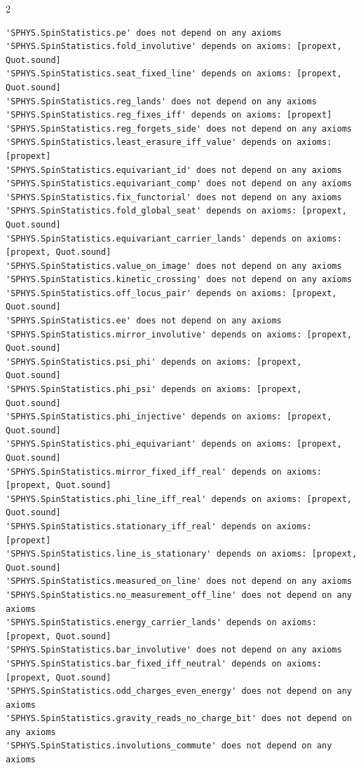 \documentclass[10pt]{article}
\begin{document}
\begin{multicols}{2}
\begin{Verbatim}[fontsize=\fontsize{6.0}{6.9}\selectfont,breaklines,breakanywhere,breaksymbolleft={}]
'SPHYS.SpinStatistics.pe' does not depend on any axioms
'SPHYS.SpinStatistics.fold_involutive' depends on axioms: [propext, Quot.sound]
'SPHYS.SpinStatistics.seat_fixed_line' depends on axioms: [propext, Quot.sound]
'SPHYS.SpinStatistics.reg_lands' does not depend on any axioms
'SPHYS.SpinStatistics.reg_fixes_iff' depends on axioms: [propext]
'SPHYS.SpinStatistics.reg_forgets_side' does not depend on any axioms
'SPHYS.SpinStatistics.least_erasure_iff_value' depends on axioms: [propext]
'SPHYS.SpinStatistics.equivariant_id' does not depend on any axioms
'SPHYS.SpinStatistics.equivariant_comp' does not depend on any axioms
'SPHYS.SpinStatistics.fix_functorial' does not depend on any axioms
'SPHYS.SpinStatistics.fold_global_seat' depends on axioms: [propext, Quot.sound]
'SPHYS.SpinStatistics.equivariant_carrier_lands' depends on axioms: [propext, Quot.sound]
'SPHYS.SpinStatistics.value_on_image' does not depend on any axioms
'SPHYS.SpinStatistics.kinetic_crossing' does not depend on any axioms
'SPHYS.SpinStatistics.off_locus_pair' depends on axioms: [propext, Quot.sound]
'SPHYS.SpinStatistics.ee' does not depend on any axioms
'SPHYS.SpinStatistics.mirror_involutive' depends on axioms: [propext, Quot.sound]
'SPHYS.SpinStatistics.psi_phi' depends on axioms: [propext, Quot.sound]
'SPHYS.SpinStatistics.phi_psi' depends on axioms: [propext, Quot.sound]
'SPHYS.SpinStatistics.phi_injective' depends on axioms: [propext, Quot.sound]
'SPHYS.SpinStatistics.phi_equivariant' depends on axioms: [propext, Quot.sound]
'SPHYS.SpinStatistics.mirror_fixed_iff_real' depends on axioms: [propext, Quot.sound]
'SPHYS.SpinStatistics.phi_line_iff_real' depends on axioms: [propext, Quot.sound]
'SPHYS.SpinStatistics.stationary_iff_real' depends on axioms: [propext]
'SPHYS.SpinStatistics.line_is_stationary' depends on axioms: [propext, Quot.sound]
'SPHYS.SpinStatistics.measured_on_line' does not depend on any axioms
'SPHYS.SpinStatistics.no_measurement_off_line' does not depend on any axioms
'SPHYS.SpinStatistics.energy_carrier_lands' depends on axioms: [propext, Quot.sound]
'SPHYS.SpinStatistics.bar_involutive' does not depend on any axioms
'SPHYS.SpinStatistics.bar_fixed_iff_neutral' depends on axioms: [propext, Quot.sound]
'SPHYS.SpinStatistics.odd_charges_even_energy' does not depend on any axioms
'SPHYS.SpinStatistics.gravity_reads_no_charge_bit' does not depend on any axioms
'SPHYS.SpinStatistics.involutions_commute' does not depend on any axioms

\end{Verbatim}
\end{multicols}
\end{document}
